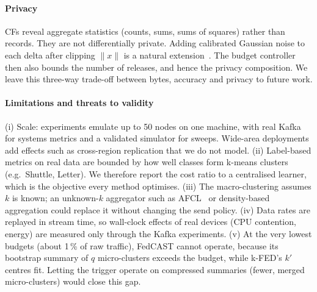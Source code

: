 \paragraph{Privacy} CFs reveal aggregate statistics (counts, sums, sums of squares) rather than records. They are not differentially private. Adding calibrated Gaussian noise to each delta after clipping $\lVert x\rVert$ is a natural extension~\cite{epasto2023dpstream}. The budget controller then also bounds the number of releases, and hence the privacy composition. We leave this three-way trade-off between bytes, accuracy and privacy to future work.

\paragraph{Limitations and threats to validity} (i) Scale: experiments emulate up to 50 nodes on one machine, with real Kafka for systems metrics and a validated simulator for sweeps. Wide-area deployments add effects such as cross-region replication that we do not model. (ii) Label-based metrics on real data are bounded by how well classes form k-means clusters (e.g.\ Shuttle, Letter). We therefore report the cost ratio to a centralised learner, which is the objective every method optimises. (iii) The macro-clustering assumes $k$ is known; an unknown-$k$ aggregator such as AFCL~\cite{zhang2025afcl} or density-based aggregation could replace it without changing the send policy. (iv) Data rates are replayed in stream time, so wall-clock effects of real devices (CPU contention, energy) are measured only through the Kafka experiments. (v) At the very lowest budgets (about 1\,\% of raw traffic), FedCAST cannot operate, because its bootstrap summary of $q$ micro-clusters exceeds the budget, while k-FED's $k'$ centres fit. Letting the trigger operate on compressed summaries (fewer, merged micro-clusters) would close this gap.
